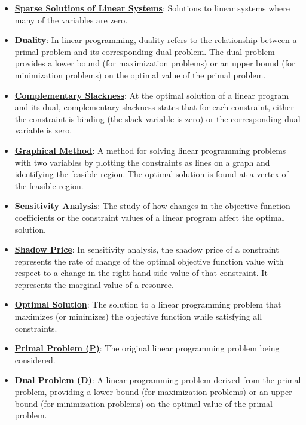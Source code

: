 \documentclass{article}%
\begin{document}
\begin{itemize}[leftmargin=*]
\item \href{https://www.math.purdue.edu/~yipn/421/2024-11-21-EconNetSimplex.pdf#page=4}{\textbf{Sparse Solutions of Linear Systems}}: Solutions to linear systems where many of the variables are zero. %
\item \href{https://www.math.purdue.edu/~yipn/421/2024-12-03-Duality.pdf#page=1}{\textbf{Duality}}: In linear programming, duality refers to the relationship between a primal problem and its corresponding dual problem. The dual problem provides a lower bound (for maximization problems) or an upper bound (for minimization problems) on the optimal value of the primal problem. %
\item \href{https://www.math.purdue.edu/~yipn/421/2024-12-03-Duality.pdf#page=2}{\textbf{Complementary Slackness}}: At the optimal solution of a linear program and its dual, complementary slackness states that for each constraint, either the constraint is binding (the slack variable is zero) or the corresponding dual variable is zero. %
\item \href{https://www.math.purdue.edu/~yipn/421/2024-12-03-Duality.pdf#page=3}{\textbf{Graphical Method}}: A method for solving linear programming problems with two variables by plotting the constraints as lines on a graph and identifying the feasible region. The optimal solution is found at a vertex of the feasible region. %
\item \href{https://www.math.purdue.edu/~yipn/421/2024-12-03-Duality.pdf#page=11}{\textbf{Sensitivity Analysis}}: The study of how changes in the objective function coefficients or the constraint values of a linear program affect the optimal solution. %
\item \href{https://www.math.purdue.edu/~yipn/421/2024-12-03-Duality.pdf#page=15}{\textbf{Shadow Price}}: In sensitivity analysis, the shadow price of a constraint represents the rate of change of the optimal objective function value with respect to a change in the right-hand side value of that constraint. It represents the marginal value of a resource. %
\item \href{https://www.math.purdue.edu/~yipn/421/2024-12-03-Duality.pdf#page=2}{\textbf{Optimal Solution}}: The solution to a linear programming problem that maximizes (or minimizes) the objective function while satisfying all constraints. %
\item \href{https://www.math.purdue.edu/~yipn/421/2024-12-03-Duality.pdf#page=1}{\textbf{Primal Problem (P)}}: The original linear programming problem being considered. %
\item \href{https://www.math.purdue.edu/~yipn/421/2024-12-03-Duality.pdf#page=1}{\textbf{Dual Problem (D)}}: A linear programming problem derived from the primal problem, providing a lower bound (for maximization problems) or an upper bound (for minimization problems) on the optimal value of the primal problem. %

\end{itemize}
\end{document}
